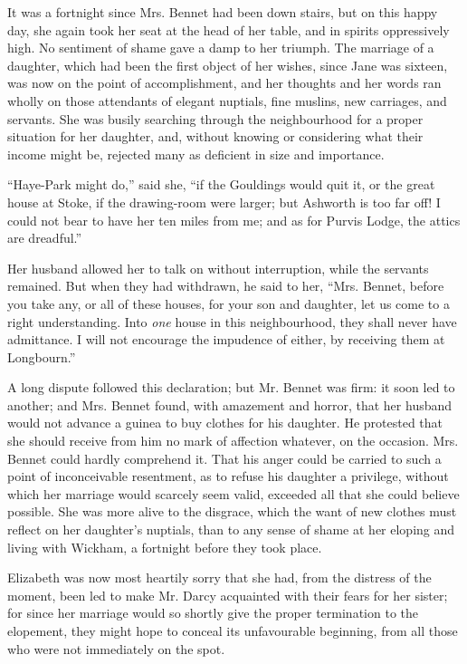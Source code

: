 It was a fortnight since Mrs. Bennet had been down
stairs, but on this happy day, she again took her seat at
the head of her table, and in spirits oppressively high.
No sentiment of shame gave a damp to her triumph.
The marriage of a daughter, which had been the first
object of her wishes, since Jane was sixteen, was now on
the point of accomplishment, and her thoughts and her
words ran wholly on those attendants of elegant nuptials,
fine muslins, new carriages, and servants. She was busily
searching through the neighbourhood for a proper situation
for her daughter, and, without knowing or considering
what their income might be, rejected many as deficient
in size and importance.

“Haye-Park might do,” said she, “if the Gouldings
would quit it, or the great house at Stoke, if the drawing-room
were larger; but Ashworth is too far off! I could
not bear to have her ten miles from me; and as for Purvis
Lodge, the attics are dreadful.”

Her husband allowed her to talk on without interruption,
while the servants remained. But when they had
withdrawn, he said to her, “Mrs. Bennet, before you take
any, or all of these houses, for your son and daughter,
let us come to a right understanding. Into \textit{one} house in
this neighbourhood, they shall never have admittance.
I will not encourage the impudence of either, by receiving
them at Longbourn.”

A long dispute followed this declaration; but Mr.
Bennet was firm: it soon led to another; and Mrs.
Bennet found, with amazement and horror, that her
husband would not advance a guinea to buy clothes for
his daughter. He protested that she should receive from
him no mark of affection whatever, on the occasion.
Mrs. Bennet could hardly comprehend it. That his anger
could be carried to such a point of inconceivable resentment,
as to refuse his daughter a privilege, without which
her marriage would scarcely seem valid, exceeded all that
she could believe possible. She was more alive to the
disgrace, which the want of new clothes must reflect on
her daughter’s nuptials, than to any sense of shame at
her eloping and living with Wickham, a fortnight before
they took place.

Elizabeth was now most heartily sorry that she had,
from the distress of the moment, been led to make Mr.
Darcy acquainted with their fears for her sister; for
since her marriage would so shortly give the proper
termination to the elopement, they might hope to conceal
its unfavourable beginning, from all those who were not
immediately on the spot.

